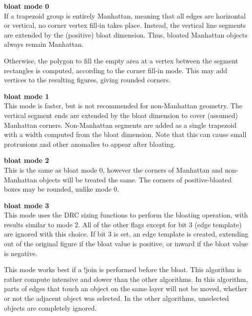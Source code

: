 \begin{description}
\item{\bf bloat mode 0}\\
    If a trapezoid group is entirely Manhattan, meaning that all edges
    are horizontal or vertical, no corner vertex fill-in takes place.
    Instead, the vertical line segments are extended by the (positive)
    bloat dimension.  Thus, bloated Manhattan objects always remain
    Manhattan.

    Otherwise, the polygon to fill the empty area at a vertex between
    the segment rectangles is computed, according to the corner
    fill-in mode.  This may add vertices to the resulting figures,
    giving rounded corners.

\item{\bf bloat mode 1}\\
    This mode is faster, but is not recommended for non-Manhattan
    geometry.  The vertical segment ends are extended by the bloat
    dimension to cover (assumed) Manhattan corners.  Non-Manhattan
    segments are added as a single trapezoid with a width computed
    from the bloat dimension.  Note that this can cause small
    protrusions and other anomalies to appear after bloating.

\item{\bf bloat mode 2}\\
    This is the same as bloat mode 0, however the corners of Manhattan
    and non-Manhattan objects will be treated the same.  The corners
    of positive-bloated boxes may be rounded, unlike mode 0.

\item{\bf bloat mode 3}\\
    This mode uses the DRC sizing functions to perform the bloating
    operation, with results similar to mode 2.  All of the other flags
    except for bit 3 (edge template) are ignored with this choice.  If
    bit 3 is set, an edge template is created, extending out of the
    original figure if the bloat value is positive, or inward if the
    bloat value is negative.

    This mode works best if a {\cb !join} is performed before the
    bloat.  This algorithm is rather compute intensive and slower than
    the other algorithms.  In this algorithm, parts of edges that
    touch an object on the same layer will not be moved, whether or
    not the adjacent object was selected.  In the other algorithms,
    unselected objects are completely ignored.
\end{description}

